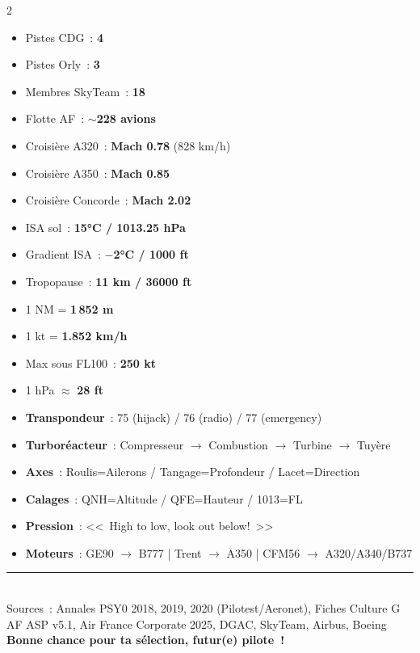 \documentclass[11pt,a4paper]{article}
\begin{document}
\begin{tcolorbox}[colback=memoyellow, colframe=orange!70, title=\textbf{Chiffres à Connaître Par C\oe ur}]
\begin{multicols}{2}
\begin{itemize}[nosep]
\item Pistes CDG~: \textbf{4}
\item Pistes Orly~: \textbf{3}
\item Membres SkyTeam~: \textbf{18}
\item Flotte AF~: \textbf{$\sim$228 avions}
\item Croisière A320~: \textbf{Mach 0.78} (828 km/h)
\item Croisière A350~: \textbf{Mach 0.85}
\item Croisière Concorde~: \textbf{Mach 2.02}
\item ISA sol~: \textbf{15°C / 1013.25 hPa}
\item Gradient ISA~: \textbf{$-$2°C / 1000 ft}
\item Tropopause~: \textbf{11 km / 36000 ft}
\item 1 NM = \textbf{1\,852 m}
\item 1 kt = \textbf{1.852 km/h}
\item Max sous FL100~: \textbf{250 kt}
\item 1 hPa $\approx$ \textbf{28 ft}
\end{itemize}
\end{multicols}
\end{tcolorbox}

\begin{tcolorbox}[colback=okgreen, colframe=green!50!black, title=\textbf{Mnémotechniques}]
\begin{itemize}[nosep]
\item \textbf{Transpondeur}~: 75 (hijack) / 76 (radio) / 77 (emergency)
\item \textbf{Turboréacteur}~: Compresseur $\to$ Combustion $\to$ Turbine $\to$ Tuyère
\item \textbf{Axes}~: Roulis=Ailerons / Tangage=Profondeur / Lacet=Direction
\item \textbf{Calages}~: QNH=Altitude / QFE=Hauteur / 1013=FL
\item \textbf{Pression}~: <<~High to low, look out below!~>>
\item \textbf{Moteurs}~: GE90 $\to$ B777 | Trent $\to$ A350 | CFM56 $\to$ A320/A340/B737
\end{itemize}
\end{tcolorbox}

\vfill
\begin{center}
\rule{0.5\textwidth}{1pt}\\[0.5cm]
{\footnotesize Sources~: Annales PSY0 2018, 2019, 2020 (Pilotest/Aeronet), Fiches Culture G AF ASP v5.1, Air France Corporate 2025, DGAC, SkyTeam, Airbus, Boeing}\\[0.3cm]
{\large\textbf{Bonne chance pour ta sélection, futur(e) pilote~!}}
\end{center}
\end{document}
